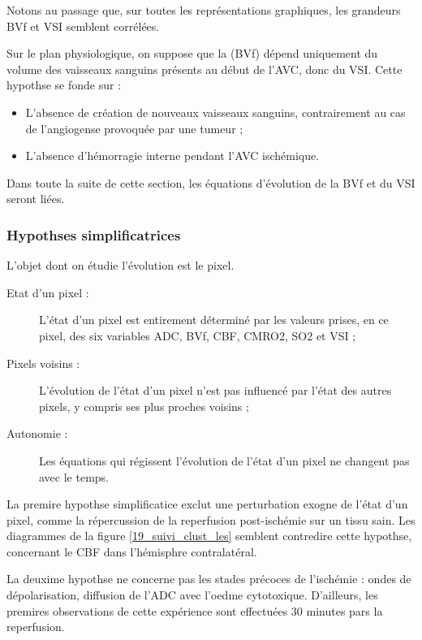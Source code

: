 \par
Notons au passage que, sur toutes les repr\'esentations graphiques, les grandeurs BVf et VSI semblent corr\'el\'ees.

\par
Sur le plan physiologique, on suppose que la (BVf) d\'epend uniquement du volume %
des vaisseaux sanguins pr\'esents au d\'ebut de l'AVC, donc du VSI. %
Cette hypothse se fonde sur :
\begin{itemize}
\item L'absence de cr\'eation de nouveaux vaisseaux sanguins, contrairement au cas de l'angiogense provoqu\'ee par une tumeur ;
\item L'absence d'h\'emorragie interne pendant l'AVC isch\'emique.
\end{itemize}

\par
Dans toute la suite de cette section, les \'equations d'\'evolution de la BVf et du VSI seront li\'ees.

\subsubsection{Hypothses simplificatrices}

L'objet dont on \'etudie l'\'evolution est le pixel.
\begin{description}
\item[Etat d'un pixel :] L'\'etat d'un pixel est entirement d\'etermin\'e par les valeurs prises, en ce pixel, des six variables ADC, BVf, CBF, CMRO2, SO2 et VSI ;
\item[Pixels voisins :] L'\'evolution de l'\'etat d'un pixel n'est pas influenc\'e par l'\'etat des autres pixels, y compris ses plus proches voisins ;
\item[Autonomie :] Les \'equations qui r\'egissent l'\'evolution de l'\'etat d'un pixel ne changent pas avec le temps.
\end{description}

La premire hypothse simplificatice exclut une perturbation exogne de l'\'etat d'un pixel, %
comme la r\'epercussion de la reperfusion post-isch\'emie sur un tissu sain. %
Les diagrammes de la figure \ref{19_suivi_clust_les} semblent contredire cette hypothse, concernant le CBF dans l'h\'emisphre contralat\'eral.

\par
La deuxime hypothse ne concerne pas les stades pr\'ecoces de l'isch\'emie : ondes de d\'epolarisation, diffusion de l'ADC avec l'oedme cytotoxique. %
D'ailleurs, les premires observations de cette exp\'erience sont effectu\'ees 30 minutes pars la reperfusion.

